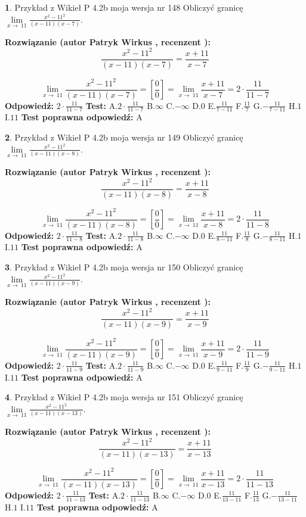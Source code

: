 \documentclass[12pt, a4paper]{article}
\theoremstyle{definition} %
\newtheorem{zad}{}
\newcommand{\zadStart}[1]{\begin{zad}#1\newline}
\newcommand{\zadStop}{\end{zad}}
\newcommand{\rozwStart}[2]{\noindent \textbf{Rozwiązanie (autor #1 , recenzent #2): }\newline}
\newcommand{\rozwStop}{\newline}
\newcommand{\odpStart}{\noindent \textbf{Odpowiedź:}\newline}
\newcommand{\odpStop}{\newline}
\newcommand{\testStart}{\noindent \textbf{Test:}\newline}
\newcommand{\testStop}{\newline}
\newcommand{\kluczStart}{\noindent \textbf{Test poprawna odpowiedź:}\newline}
\newcommand{\kluczStop}{\newline}
\begin{document}
\zadStart{Przykład z Wikieł P 4.2b moja wersja nr 148}
Obliczyć granicę $\lim\limits_{x\to\ 11}\frac{x^{2}-11^{2}}{(x-11)(x-7)}$.
\zadStop
\rozwStart{Patryk Wirkus}{}
$$\frac{x^{2}-11^{2}}{(x-11)(x-7)}=\frac{x+11}{x-7}$$

$$\lim\limits_{x\to\ 11}\frac{x^{2}-11^{2}}{(x-11)(x-7)}=[\frac{0}{0}]=\lim\limits_{x\to\ 11}\frac{x+11}{x-7}=2 \cdot \frac{11}{11-7}$$
\rozwStop
\odpStart
$2 \cdot \frac{11}{11-7}$
\odpStop
\testStart
A.$2 \cdot \frac{11}{11-7}$
B.$\infty$
C.$-\infty$
D.$0$
E.$\frac{11}{7-11}$
F.$\frac{11}{7}$
G.$-\frac{11}{7-11}$
H.$1$
I.$11$
\testStop
\kluczStart
A
\kluczStop



\zadStart{Przykład z Wikieł P 4.2b moja wersja nr 149}
Obliczyć granicę $\lim\limits_{x\to\ 11}\frac{x^{2}-11^{2}}{(x-11)(x-8)}$.
\zadStop
\rozwStart{Patryk Wirkus}{}
$$\frac{x^{2}-11^{2}}{(x-11)(x-8)}=\frac{x+11}{x-8}$$

$$\lim\limits_{x\to\ 11}\frac{x^{2}-11^{2}}{(x-11)(x-8)}=[\frac{0}{0}]=\lim\limits_{x\to\ 11}\frac{x+11}{x-8}=2 \cdot \frac{11}{11-8}$$
\rozwStop
\odpStart
$2 \cdot \frac{11}{11-8}$
\odpStop
\testStart
A.$2 \cdot \frac{11}{11-8}$
B.$\infty$
C.$-\infty$
D.$0$
E.$\frac{11}{8-11}$
F.$\frac{11}{8}$
G.$-\frac{11}{8-11}$
H.$1$
I.$11$
\testStop
\kluczStart
A
\kluczStop



\zadStart{Przykład z Wikieł P 4.2b moja wersja nr 150}
Obliczyć granicę $\lim\limits_{x\to\ 11}\frac{x^{2}-11^{2}}{(x-11)(x-9)}$.
\zadStop
\rozwStart{Patryk Wirkus}{}
$$\frac{x^{2}-11^{2}}{(x-11)(x-9)}=\frac{x+11}{x-9}$$

$$\lim\limits_{x\to\ 11}\frac{x^{2}-11^{2}}{(x-11)(x-9)}=[\frac{0}{0}]=\lim\limits_{x\to\ 11}\frac{x+11}{x-9}=2 \cdot \frac{11}{11-9}$$
\rozwStop
\odpStart
$2 \cdot \frac{11}{11-9}$
\odpStop
\testStart
A.$2 \cdot \frac{11}{11-9}$
B.$\infty$
C.$-\infty$
D.$0$
E.$\frac{11}{9-11}$
F.$\frac{11}{9}$
G.$-\frac{11}{9-11}$
H.$1$
I.$11$
\testStop
\kluczStart
A
\kluczStop



\zadStart{Przykład z Wikieł P 4.2b moja wersja nr 151}
Obliczyć granicę $\lim\limits_{x\to\ 11}\frac{x^{2}-11^{2}}{(x-11)(x-13)}$.
\zadStop
\rozwStart{Patryk Wirkus}{}
$$\frac{x^{2}-11^{2}}{(x-11)(x-13)}=\frac{x+11}{x-13}$$

$$\lim\limits_{x\to\ 11}\frac{x^{2}-11^{2}}{(x-11)(x-13)}=[\frac{0}{0}]=\lim\limits_{x\to\ 11}\frac{x+11}{x-13}=2 \cdot \frac{11}{11-13}$$
\rozwStop
\odpStart
$2 \cdot \frac{11}{11-13}$
\odpStop
\testStart
A.$2 \cdot \frac{11}{11-13}$
B.$\infty$
C.$-\infty$
D.$0$
E.$\frac{11}{13-11}$
F.$\frac{11}{13}$
G.$-\frac{11}{13-11}$
H.$1$
I.$11$
\testStop
\kluczStart
A
\kluczStop
\end{document}
